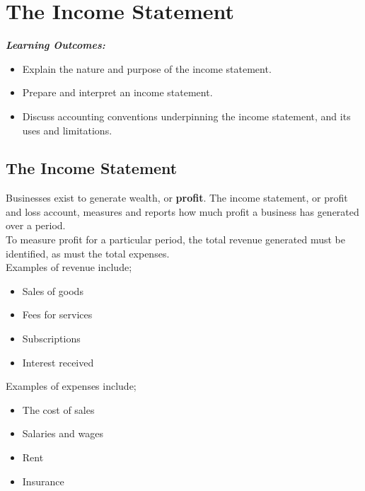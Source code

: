\documentclass{report}
\newenvironment{blackbox}[1][Black]
  {\begin{tcolorbox}[colframe=#1,colback=white]}
  {\end{tcolorbox}}
\begin{document}
\chapter{The Income Statement}
\begin{blackbox}
    \textbf{\textit{Learning Outcomes:}}\\
    \begin{itemize}
    \item Explain the nature and purpose of the income statement.
    \item Prepare and interpret an income statement.
    \item Discuss accounting conventions underpinning the income statement, and its uses and limitations.
\end{itemize}
\end{blackbox}

\section{The Income Statement}

Businesses exist to generate wealth, or \textbf{profit}. The income statement, or profit and loss account, measures and reports how much profit a business has generated over a period.\\

To measure profit for a particular period, the total revenue generated must be identified, as must the total expenses.\\

Examples of revenue include;
\begin{itemize}
    \item Sales of goods
    \item Fees for services
    \item Subscriptions
    \item Interest received\\
\end{itemize}

Examples of expenses include;
\begin{itemize}
    \item The cost of sales
    \item Salaries and wages
    \item Rent
    \item Insurance\\
\end{itemize}
\end{document}

